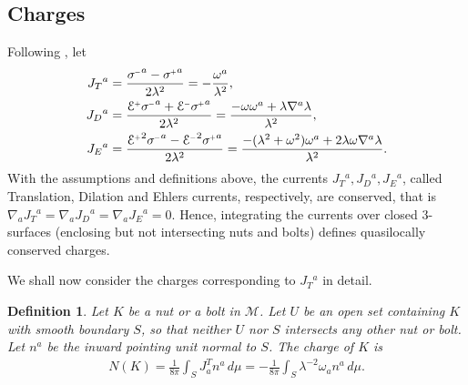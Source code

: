 \documentclass[a4paper,11pt,reqno]{amsart}
\newcommand{\cM}{\mathcal{M}}
\theoremstyle{plain}
\newtheorem{definition}[thm]{Definition}
\renewcommand{\P}[1]{{{#1}^{\hspace{-.5pt}\scaleto{+}{4pt}}}}
\newcommand{\M}[1]{{{#1}^{\hspace{-.5pt}\scaleto{-}{4pt}}}}
\def\Ecal{\mathcal{E}}
\numberwithin{equation}{section}
\begin{document}
\subsection{Charges} 
Following \cite[\S 5]{gibbons:hawking:1979}, let 
\begin{subequations}\label{eq:currents}
\begin{align}
J_{T}{}^{a}={}&\frac{\M{\sigma}^{a} -  \P{\sigma}^{a}}{2 \lambda^2} = - \frac{\omega^a}{\lambda^2}, \label{eq:JT-def} \\
J_{D}{}^{a}={}&\frac{\P{\Ecal} \M{\sigma}^{a} + \M{\Ecal} \P{\sigma}^{a}}{2 \lambda^2} = \frac{-\omega \omega^a + \lambda \nabla^a\lambda}{\lambda^2},\\
J_{E}{}^{a}={}&\frac{\P{\Ecal}^2 \M{\sigma}^{a} -  \M{\Ecal}^2 \P{\sigma}^{a}}{2 \lambda^2} = \frac{-(\lambda^2 + \omega^2)\omega^a + 2\lambda\omega\nabla^a\lambda}{\lambda^2} .
\end{align}
\end{subequations}
With the assumptions and definitions above, the currents $J_{T}{}^{a}, J_{D}{}^{a}, J_{E}{}^{a}$, called Translation, Dilation and Ehlers currents, respectively, are conserved, that is $\nabla_a J_{T}{}^{a} = \nabla_a J_{D}{}^{a} = \nabla_a J_{E}{}^{a} = 0$. Hence, integrating the currents over closed 3-surfaces  (enclosing but not intersecting nuts and bolts) defines quasilocally conserved charges.  

We shall now consider the charges corresponding to $J_T{}^a$ in detail.

\begin{definition}
Let $K$ be a nut or a bolt in $\cM$. Let $U$ be an open set containing $K$ with smooth boundary $S$, so that neither $U$ nor $S$ intersects any other nut or bolt. Let $n^a$ be the inward pointing unit normal to $S$. The charge of $K$ is 
\begin{align}
N(K) = \frac{1}{8\pi} \int_S J^T _a n^a \, d\mu
= -\frac{1}{8\pi} \int_S \lambda^{-2} \omega_a n^a \, d\mu.
\end{align}
%
%
\end{definition} 
\end{document}

